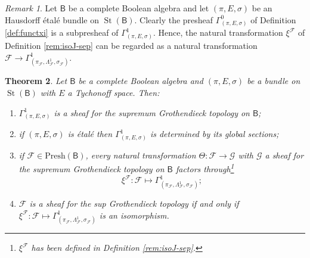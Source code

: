 \documentclass[11pt]{amsart}
\newcommand{\F}{\mathcal{F}}
\newcommand{\G}{\mathcal{G}}
\newcommand{\Presh}{\textrm{Presh}}
\theoremstyle{plain}
\newtheorem{theorem}{Theorem}[section]
\theoremstyle{definition}
\theoremstyle{plain}
\theoremstyle{remark}
\newtheorem{remark}[theorem]{Remark}
\DeclareMathOperator{\St}{St}
\newcommand{\bool}[1]{\mathsf{#1}}
\newcommand{\0}{\mathsf{0}}
\renewcommand{\1}{\mathsf{1}}
\renewcommand{\2}{\mathsf{2}}
\theoremstyle{definition}
\begin{document}
\begin{remark}\label{rmrk:xitogamma}
Let $\bool{B}$ be a complete Boolean algebra and let $(\pi,E,\sigma)$ be an Hausdorff \'etal\'e bundle on $\St(\bool{B})$. Clearly the presheaf $\Gamma^0_{(\pi,E,\sigma)}$ of Definition \ref{def:functxi} is a subpresheaf of $\Gamma^1_{(\pi, E, \sigma)}$. Hence, the natural transformation $\xi^\F$ of Definition \ref{rem:isoJ-sep} can be regarded as a natural transformation $\F\to\Gamma^1_{(\pi_\F, \Lambda^1_\F,\sigma_\F)}$.%
\end{remark}
 \begin{theorem}\label{mainthm:sheaf}
Let $\bool{B}$ be a complete Boolean algebra 
and $(\pi, E, \sigma)$ be a bundle on $\St(\bool{B})$ with $E$ a Tychonoff space. Then:
\begin{enumerate}
\item $\Gamma^1_{(\pi, E,\sigma)}$ is a sheaf for the supremum Grothendieck topology on $\bool{B}$;
\item if $(\pi, E, \sigma)$ is \'etal\'e then $\Gamma^1_{(\pi, E,\sigma)}$ is determined by its global sections;
\item if $\F\in\Presh(\bool{B})$, every natural transformation $\Theta:\F\to\G$ with $\G$ a sheaf for the supremum Grothendieck topology on $\bool{B}$ factors through\footnote{$\xi^\F$ has been defined in Definition \ref{rem:isoJ-sep}.}
 \[
\xi^\F:\F\mapsto\Gamma^1_{(\pi_\F,\Lambda^1_\F, \sigma_\F)};
\]
\item $\F$ is a sheaf for the sup Grothendieck topology if and only if $\xi^\F:\F\mapsto\Gamma^1_{(\pi_\F,\Lambda^1_\F, \sigma_\F)}$ is an isomorphism.
\end{enumerate}
 \end{theorem}
\end{document}
